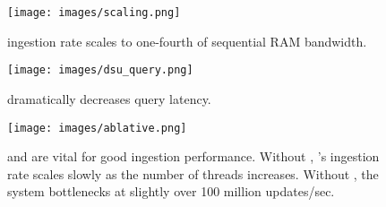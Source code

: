 \begin{figure}
\begin{center}
\texttt{[image: images/scaling.png]}
\end{center} 
\caption{\sysname ingestion rate scales to one-fourth of sequential RAM bandwidth.}
\end{figure}

\begin{figure}
\begin{center}
\texttt{[image: images/dsu\_query.png]}
\end{center} 
\caption{\dsuname dramatically decreases query latency.}
\end{figure}

\begin{figure}
\begin{center}
\texttt{[image: images/ablative.png]}
\end{center} 
\caption{\sketchname and \treename are vital for good ingestion performance. Without \sketchname, \sysname's ingestion rate scales slowly as the number of threads increases. Without \treename, the system bottlenecks at slightly over 100 million updates/sec.}
\end{figure}
